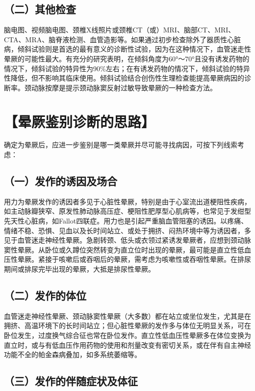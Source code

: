 \subsection{（二）其他检查}

脑电图、视频脑电图、颈椎X线照片或颈椎CT（或）MRI、脑部CT、MRI、CTA、MRA、脑脊液检测、血管造影等。如果通过初步检查除外了器质性心脏病，倾斜试验则是首选的最有意义的诊断性试验，因为在这种情况下，血管迷走性晕厥的可能性最大。有充分的研究表明，在倾斜角度为60°～70°且没有诱发药物的情况下，倾斜试验的特异性为90\%左右；在有诱发药物的情况下，倾斜试验的特异性降低，但不影响其临床使用。倾斜试验结合创伤性生理检查能提高晕厥病因的诊断率。颈动脉按摩是提示颈动脉窦反射过敏导致晕厥的一种检查方法。

\section{【晕厥鉴别诊断的思路】}

确定为晕厥后，应进一步鉴别是哪一类晕厥并尽可能寻找病因，可按下列线索考虑：

\subsection{（一）发作的诱因及场合}

用力为晕厥发作的诱因者多见于心脏性晕厥，特别是由于心室流出道梗阻性疾病，如主动脉瓣狭窄、原发性肺动脉高压症、梗阻性肥厚型心肌病等，也常见于发绀型先天性心脏病，如Fallot四联症。用力也是引起严重脑血管阻塞的诱因。以疼痛、情绪不稳、恐惧、见血以及长时间站立、或处于拥挤、闷热环境中等为诱因者，多见于血管迷走神经性晕厥。急剧转颈、低头或衣领过紧诱发晕厥者，应想到颈动脉窦性晕厥。从卧位或久蹲位突然转变为直立位时出现的晕厥，最可能是直立性低血压性晕厥。紧接于咳嗽后或吞咽后的晕厥，需考虑为咳嗽性或吞咽性晕厥。在排尿期间或排尿完毕出现的晕厥，大抵是排尿性晕厥。

\subsection{（二）发作的体位}

血管迷走神经性晕厥、颈动脉窦性晕厥（大多数）都在站立或坐位发生，尤其是在拥挤、高温环境下的长时间站立；但心脏性晕厥的发作多与体位无明显关系，可在卧位发生，过度换气综合征也常在卧位发作。直立性低血压性晕厥多在体位变换为直立时，或与有低血压作用药物的使用和剂量改变有密切关系，或在伴有自主神经功能不全的帕金森病叠加，如多系统萎缩等。

\subsection{（三）发作的伴随症状及体征}

